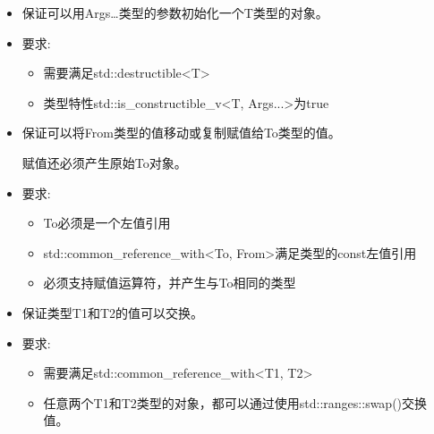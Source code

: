 
\begin{itemize}
\item
保证可以用Args…类型的参数初始化一个T类型的对象。

\item
要求:
\begin{itemize}
\item
需要满足std::destructible<T> 

\item
类型特性std::is\_constructible\_v<T, Args...>为true
\end{itemize}
\end{itemize}


\begin{itemize}
\item
保证可以将From类型的值移动或复制赋值给To类型的值。

赋值还必须产生原始To对象。

\item
要求:
\begin{itemize}
\item
To必须是一个左值引用

\item
std::common\_reference\_with<To, From>满足类型的const左值引用

\item
必须支持赋值运算符，并产生与To相同的类型
\end{itemize}
\end{itemize}


\begin{itemize}
\item
保证类型T1和T2的值可以交换。

\item
要求:
\begin{itemize}
\item
需要满足std::common\_reference\_with<T1, T2>

\item
任意两个T1和T2类型的对象，都可以通过使用std::ranges::swap()交换值。
\end{itemize}
\end{itemize}


